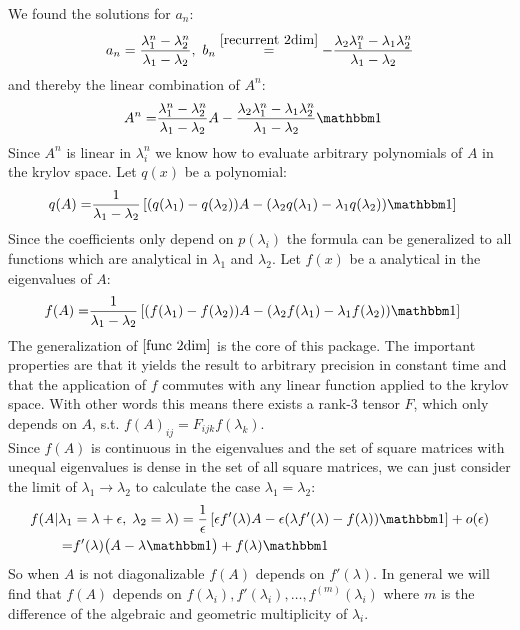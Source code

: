 \documentclass[12pt]{article}
\begin{document}
We found the solutions for $a_n$:
\begin{align}
a_n = \frac {\lambda_1^n - \lambda_2^n}{\lambda_1 - \lambda_2},\ b_n \overset{\eqref{recurrent 2dim}}=-\frac {\lambda_2\lambda_1^n - \lambda_1\lambda_2^n}{\lambda_1 - \lambda_2}
\end{align}
and thereby the linear combination of $A^n$:
\begin{align}
A^n =& \frac {\lambda_1^n - \lambda_2^n}{\lambda_1 - \lambda_2} A - \frac {\lambda_2\lambda_1^n - \lambda_1\lambda_2^n}{\lambda_1 - \lambda_2} \mathbbm 1
\end{align}
Since $A^n$ is linear in $\lambda_i^n$ we know how to evaluate arbitrary polynomials of $A$ in the krylov space. Let $q(x)$ be a polynomial:
\begin{align}
q(A) =& \frac 1{\lambda_1 - \lambda_2} \left[(q(\lambda_1) - q(\lambda_2))A - (\lambda_2 q(\lambda_1) - \lambda_1 q(\lambda_2)) \mathbbm 1\right]
\end{align}
Since the coefficients only depend on $p(\lambda_i)$ the formula can be generalized to all functions which are analytical in $\lambda_1$ and $\lambda_2$. Let $f(x)$ be a analytical in the eigenvalues of $A$:
\begin{align}
f(A) =& \frac 1{\lambda_1 - \lambda_2} \left[(f(\lambda_1) - f(\lambda_2))A - (\lambda_2 f(\lambda_1) - \lambda_1 f(\lambda_2)) \mathbbm 1\right] \label{func 2dim}
\end{align}
The generalization of $\eqref{func 2dim}$ is the core of this package. The important properties are that it yields the result to arbitrary precision in constant time and that the application of $f$ commutes with any linear function applied to the krylov space. With other words this means there exists a rank-3 tensor $F$, which only depends on $A$, s.t. $f(A)_{ij} = F_{ijk} f(\lambda_k)$.\\
Since $f(A)$ is continuous in the eigenvalues and the set of square matrices with unequal eigenvalues is dense in the set of all square matrices, we can just consider the limit of $\lambda_1 \to \lambda_2$ to calculate the case $\lambda_1 = \lambda_2$:
\begin{align*}
f(A|\lambda_1&=\lambda+\epsilon,\; \lambda_2 = \lambda) = \frac 1\epsilon \left[ \epsilon f'(\lambda) A - \epsilon(\lambda f'(\lambda) - f(\lambda))\mathbbm 1 \right] + o(\epsilon) \nonumber\\
=& f'(\lambda)\big( A-\lambda \mathbbm 1 \big) + f(\lambda)\mathbbm 1
\end{align*}
So when $A$ is not diagonalizable $f(A)$ depends on $f'(\lambda)$. In general we will find that $f(A)$ depends on $f(\lambda_i), f'(\lambda_i), \dots, f^{(m)}(\lambda_i)$ where $m$ is the difference of the algebraic and geometric multiplicity of $\lambda_i$.
\end{document}
